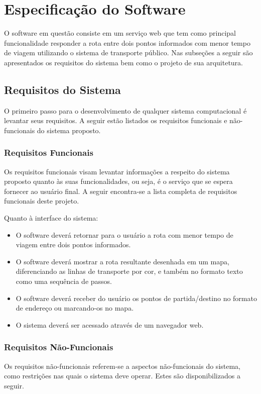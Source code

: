 
\chapter{Especificação do Software}
O software em questão consiste em um serviço web que tem como principal funcionalidade responder a rota entre dois pontos informados com menor tempo de viagem utilizando o sistema de transporte público. 
Nas subseções a seguir são apresentados os requisitos do sistema bem como o projeto de sua arquitetura.

\section{Requisitos do Sistema}
O primeiro passo para o desenvolvimento de qualquer sistema computacional é levantar seus requisitos. 
A seguir estão listados os requisitos funcionais e não-funcionais do sistema proposto.

\subsection{Requisitos Funcionais}
Os requisitos funcionais visam levantar informações a respeito do sistema proposto quanto às suas funcionalidades, ou seja, é o serviço que se espera fornecer ao usuário final.
A seguir encontra-se a lista completa de requisitos funcionais deste projeto. 

Quanto à interface do sistema:
\begin{itemize}
	\item O software deverá retornar para o usuário a rota com menor tempo de viagem entre dois pontos informados.
	\item O software deverá mostrar a rota resultante desenhada em um mapa, diferenciando as linhas de transporte por cor, e também no formato texto como uma sequência de passos.
	\item O software deverá receber do usuário os pontos de partida/destino no formato de endereço ou marcando-os no mapa.
	\item O sistema deverá ser acessado através de um navegador web.
\end{itemize}

\subsection{Requisitos Não-Funcionais}
Os requisitos não-funcionais referem-se a aspectos não-funcionais do sistema, como restrições nas quais o sistema deve operar.
Estes são disponibilizados a seguir.

